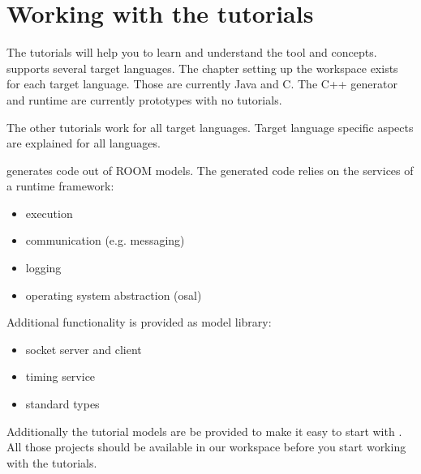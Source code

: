 \section{Working with the tutorials}

The \eTrice{} tutorials will help you to learn and understand the \eTrice{} tool and concepts. \eTrice{} supports 
several target languages. 
The chapter setting up the workspace exists for each target language. Those are currently Java and C. The C++ generator 
and runtime are currently prototypes with no tutorials. 

The other tutorials work for all target languages. Target language specific aspects are explained for all languages. 

\eTrice{} generates code out of ROOM models. The generated code relies on the services of a runtime 
framework:
\begin{itemize}
\item execution
\item communication (e.g. messaging)
\item logging
\item operating system abstraction (osal)
\end{itemize}

Additional functionality is provided as model library:
\begin{itemize}
\item socket server and client
\item timing service
\item standard types
\end{itemize}

Additionally the tutorial models are be provided to make it easy to start with \eTrice{}. All those projects 
should be available in our workspace before you start working with the tutorials. 
